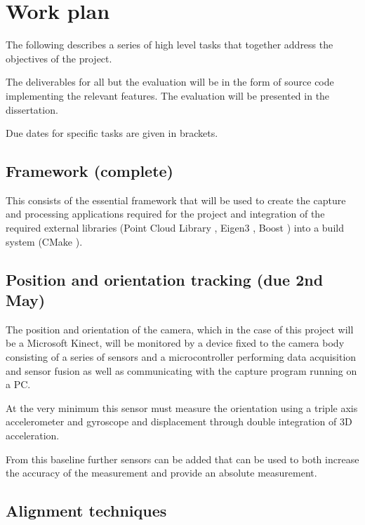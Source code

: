 \documentclass{entcs}
\begin{document}
\section{Work plan}
\label{sec:work_plan}

The following describes a series of high level tasks that together address the
objectives of the project.

The deliverables for all but the evaluation will be in the form of source code
implementing the relevant features. The evaluation will be presented in the
dissertation.

Due dates for specific tasks are given in brackets.

\subsection{Framework (complete)}
\label{sec:framework}

This consists of the essential framework that will be used to create the capture
and processing applications required for the project and integration of the
required external libraries (Point Cloud Library \cite{Rusu_ICRA2011_PCL},
Eigen3 \cite{eigenweb}, Boost \cite{BoostLibs}) into a build system (CMake
\cite{CMake}).

\subsection{Position and orientation tracking (due 2nd May)}
\label{sec:position_and_orientation_tracking}

The position and orientation of the camera, which in the case of this project
will be a Microsoft Kinect, will be monitored by a device fixed to the camera
body consisting of a series of sensors and a microcontroller performing data
acquisition and sensor fusion as well as communicating with the capture program
running on a PC.

At the very minimum this sensor must measure the orientation using a triple axis
accelerometer and gyroscope and displacement through double integration of 3D
acceleration.

From this baseline further sensors can be added that can be used to both
increase the accuracy of the measurement and provide an absolute measurement.

\subsection{Alignment techniques}
\label{sec:alignment_techniques}
\end{document}
